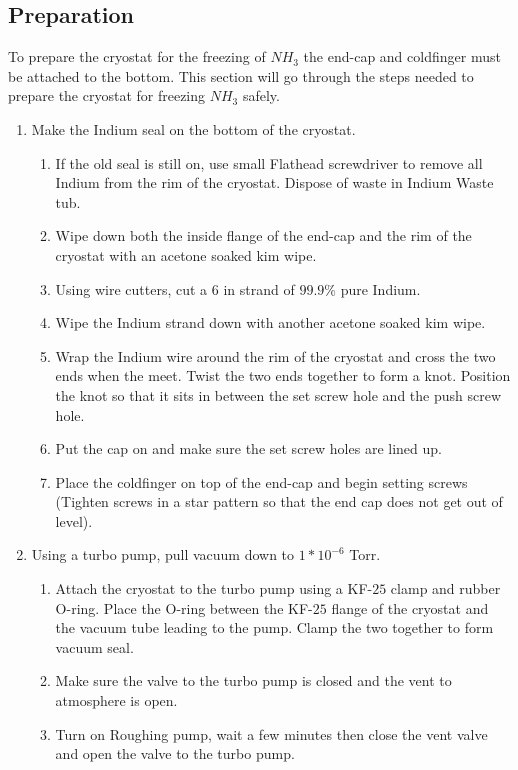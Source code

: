 \documentclass[12pt,notitlepage]{amsart}
\begin{document}
  \subsection{Preparation}
      To prepare the cryostat for the freezing of $NH_{3}$ the end-cap and coldfinger must be attached to the bottom. This section will go through the steps needed to prepare the cryostat for freezing $NH_{3}$ safely.
      \begin{enumerate}
          \item Make the Indium seal on the bottom of the cryostat.
            \begin{enumerate}
                \item If the old seal is still on, use small Flathead screwdriver to remove all Indium from the rim of the cryostat. Dispose of waste in Indium Waste tub.
                \item Wipe down both the inside flange of the end-cap and the rim of the cryostat with an acetone soaked kim wipe.
                \item Using wire cutters, cut a $6$ in strand of $99.9\%$ pure Indium.
                \item Wipe the Indium strand down with another  acetone soaked kim wipe.
                \item Wrap the Indium wire around the rim of the cryostat and cross the two ends when the meet. Twist the two ends together to form a knot. Position the knot so that it sits in between the set screw hole and the push screw hole.
                \item Put the cap on and make sure the set screw holes are lined up.
                \item Place the coldfinger on top of the end-cap and begin setting screws (Tighten screws in a star pattern so that the end cap does not get out of level).
            \end{enumerate}
          \item Using a turbo pump, pull vacuum down to $1*10^{-6}$ Torr.
            \begin{enumerate}
                \item Attach the cryostat to the turbo pump using a KF-$25$ clamp and rubber O-ring. Place the O-ring between the KF-$25$ flange of the cryostat and the vacuum tube leading to the pump. Clamp the two together to form vacuum seal.
                \item Make sure the valve to the turbo pump is closed and the vent to atmosphere is open.
                \item Turn on Roughing pump, wait a few minutes then close the vent valve and open the valve to the turbo pump.

\end{enumerate}
\end{enumerate}
\end{document}
